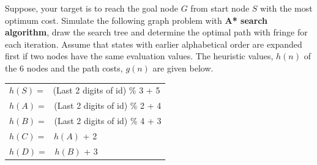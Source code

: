 \vspace{2em}
\begin{Question}[7][CO2 \rgbGray{/} S-23]
Suppose, your target is to reach the goal node $G$ from start node $S$ with the most optimum cost. Simulate the following graph problem with \textbf{A* search algorithm}, draw the search tree and determine the optimal path with fringe for each iteration. Assume that states with earlier alphabetical order are expanded first if two nodes have the same evaluation values. The heuristic values, $h(n)$ of the 6 nodes and the path costs, $g(n)$ are given below.

\vspace{1em}
\begin{center}
   \begin{minipage}{0.4\textwidth}
      \begin{tabular}{l}
         $h(S) =$ \ (Last 2 digits of id) \% 3 + 5 \\
         $h(A) =$ \ (Last 2 digits of id) \% 2 + 4 \\
         $h(B) =$ \ (Last 2 digits of id) \% 4 + 3 \\
         $h(C) =$ \ $h(A)$ + 2 \\
         $h(D) =$ \ $h(B)$ + 3
      \end{tabular}
   \end{minipage}%
   \begin{minipage}{0.4\textwidth}
   \end{minipage}
\end{center}
\end{Question}

